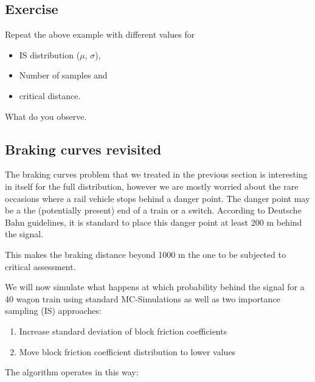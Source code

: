 \documentclass[11pt,a4paper, d]{scrartcl}
\providecommand{\tightlist}{%
      \setlength{\itemsep}{0pt}\setlength{\parskip}{0pt}}
\begin{document}
    \hypertarget{exercise}{%
\subsection{Exercise}\label{exercise}}

Repeat the above example with different values for

\begin{itemize}
\tightlist
\item
  IS distribution (\(\mu\), \(\sigma\)),
\item
  Number of samples and
\item
  critical distance.
\end{itemize}

What do you observe.

    \hypertarget{braking-curves-revisited}{%
\subsection{Braking curves revisited}\label{braking-curves-revisited}}

The braking curves problem that we treated in the previous section is
interesting in itself for the full distribution, however we are mostly
worried about the rare occasions where a rail vehicle stops behind a
danger point. The danger point may be a the (potentially present) end of
a train or a switch. According to Deutsche Bahn guidelines, it is
standard to place this danger point at least 200 m behind the signal.

This makes the braking distance beyond 1000 m the one to be subjected to
critical assessment.

We will now simulate what happens at which probability behind the signal
for a 40 wagon train using standard MC-Simulations as well as two
importance sampling (IS) approaches:

\begin{enumerate}
\def\labelenumi{\arabic{enumi}.}
\tightlist
\item
  Increase standard deviation of block friction coefficients
\item
  Move block friction coefficient distribution to lower values
\end{enumerate}

    The algorithm operates in this way:
\end{document}
